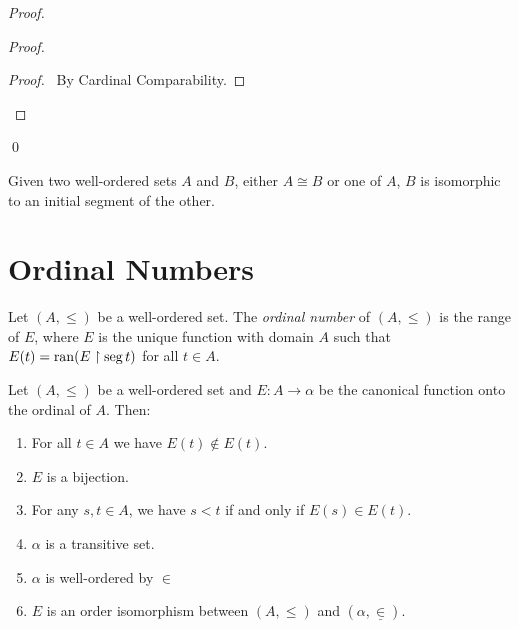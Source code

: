 \begin{proof}
    \begin{proof}
        \begin{proof}
            \pf\ By Cardinal Comparability.
        \end{proof}
    \end{proof}
    \qed
\end{proof}

\begin{theorem}
    Given two well-ordered sets $A$ and $B$, either $A \cong B$ or one of $A$, $B$
    is isomorphic to an initial segment of the other.
\end{theorem}

\section{Ordinal Numbers}

\begin{definition}
    Let $(A, \leq)$ be a well-ordered set. The \emph{ordinal number} of $(A, \leq)$
    is the range of $E$, where $E$ is the unique function with domain $A$
    such that $E(t) = \operatorname{ran} (E \restriction \operatorname{seg} t)$ for all $t \in A$.
\end{definition}

\begin{theorem}
    Let $(A, \leq)$ be a well-ordered set and $E : A \rightarrow \alpha$ be the
    canonical function onto the ordinal of $A$. Then:
    \begin{enumerate}
        \item For all $t \in A$ we have $E(t) \notin E(t)$.
        \item $E$ is a bijection.
        \item For any $s, t \in A$, we have $s < t$ if and only if $E(s) \in E(t)$.
        \item $\alpha$ is a transitive set.
        \item $\alpha$ is well-ordered by $\in$
        \item $E$ is an order isomorphism between $(A, \leq)$ and $(\alpha, \underline{\in})$.
    \end{enumerate}
\end{theorem}

